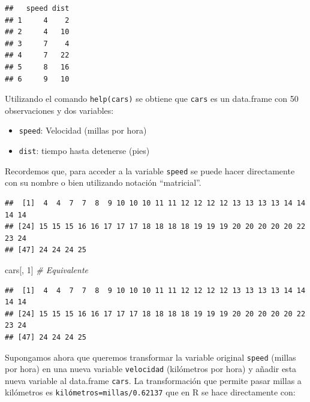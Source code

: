 \documentclass[]{book}
\newenvironment{Shaded}{\begin{snugshade}}{\end{snugshade}}
\newcommand{\CommentTok}[1]{\textcolor[rgb]{0.56,0.35,0.01}{\textit{#1}}}
\newcommand{\DecValTok}[1]{\textcolor[rgb]{0.00,0.00,0.81}{#1}}
\newcommand{\NormalTok}[1]{#1}
\newcommand{\OperatorTok}[1]{\textcolor[rgb]{0.81,0.36,0.00}{\textbf{#1}}}
\begin{document}
\begin{verbatim}
##   speed dist
## 1     4    2
## 2     4   10
## 3     7    4
## 4     7   22
## 5     8   16
## 6     9   10
\end{verbatim}

Utilizando el comando \texttt{help(cars)}
se obtiene que \texttt{cars} es un data.frame con 50 observaciones y dos
variables:

\begin{itemize}
\item
  \texttt{speed}: Velocidad (millas por hora)
\item
  \texttt{dist}: tiempo hasta detenerse (pies)
\end{itemize}

Recordemos que, para acceder a la variable \texttt{speed} se puede
hacer directamente con su nombre o bien utilizando notación
``matricial''.

\begin{Shaded}
\end{Shaded}

\begin{verbatim}
##  [1]  4  4  7  7  8  9 10 10 10 11 11 12 12 12 12 13 13 13 13 14 14 14 14
## [24] 15 15 15 16 16 17 17 17 18 18 18 18 19 19 19 20 20 20 20 20 22 23 24
## [47] 24 24 24 25
\end{verbatim}

\begin{Shaded}
\begin{Highlighting}[]
\NormalTok{cars[, }\DecValTok{1}\NormalTok{]  }\CommentTok{# Equivalente}
\end{Highlighting}
\end{Shaded}

\begin{verbatim}
##  [1]  4  4  7  7  8  9 10 10 10 11 11 12 12 12 12 13 13 13 13 14 14 14 14
## [24] 15 15 15 16 16 17 17 17 18 18 18 18 19 19 19 20 20 20 20 20 22 23 24
## [47] 24 24 24 25
\end{verbatim}

Supongamos ahora que queremos transformar la variable original \texttt{speed}
(millas por hora) en una nueva variable \texttt{velocidad} (kilómetros por
hora) y añadir esta nueva variable al data.frame \texttt{cars}.
La transformación que permite pasar millas a kilómetros es
\texttt{kilómetros=millas/0.62137} que en R se hace directamente con:
\end{document}
